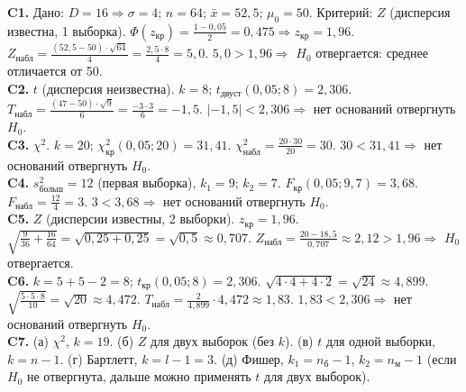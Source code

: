 \documentclass[a4paper,11pt]{extarticle}
\newcommand{\kr}{\text{кр}}\newcommand{\nab}{\text{набл}}
\begin{document}
\medskip
\textbf{C1.} Дано: $D=16\Rightarrow\sigma=4$; $n=64$; $\bar x=52{,}5$; $\mu_0=50$. Критерий: $Z$ (дисперсия известна, 1 выборка). $\Phi(z_\kr)=\frac{1-0{,}05}{2}=0{,}475\Rightarrow z_\kr=1{,}96$. $Z_\nab=\frac{(52{,}5-50)\cdot\sqrt{64}}{4}=\frac{2{,}5\cdot8}{4}=5{,}0$. $5{,}0>1{,}96\Rightarrow$ $H_0$ отвергается: среднее отличается от 50.\\
\textbf{C2.} $t$ (дисперсия неизвестна). $k=8$; $t_{\text{двуст}}(0{,}05;8)=2{,}306$. $T_\nab=\frac{(47-50)\cdot\sqrt9}{6}=\frac{-3\cdot3}{6}=-1{,}5$. $|{-1{,}5}|<2{,}306\Rightarrow$ нет оснований отвергнуть $H_0$.\\
\textbf{C3.} $\chi^2$. $k=20$; $\chi^2_\kr(0{,}05;20)=31{,}41$. $\chi^2_\nab=\frac{20\cdot30}{20}=30$. $30<31{,}41\Rightarrow$ нет оснований отвергнуть $H_0$.\\
\textbf{C4.} $s^2_{\text{больш}}=12$ (первая выборка), $k_1=9$; $k_2=7$. $F_\kr(0{,}05;9,7)=3{,}68$. $F_\nab=\frac{12}{4}=3$. $3<3{,}68\Rightarrow$ нет оснований отвергнуть $H_0$.\\
\textbf{C5.} $Z$ (дисперсии известны, 2 выборки). $z_\kr=1{,}96$. $\sqrt{\frac9{36}+\frac{16}{64}}=\sqrt{0{,}25+0{,}25}=\sqrt{0{,}5}\approx0{,}707$. $Z_\nab=\frac{20-18{,}5}{0{,}707}\approx2{,}12>1{,}96\Rightarrow$ $H_0$ отвергается.\\
\textbf{C6.} $k=5+5-2=8$; $t_\kr(0{,}05;8)=2{,}306$. $\sqrt{4\cdot4+4\cdot2}=\sqrt{24}\approx4{,}899$. $\sqrt{\frac{5\cdot5\cdot8}{10}}=\sqrt{20}\approx4{,}472$. $T_\nab=\frac{2}{4{,}899}\cdot4{,}472\approx1{,}83$. $1{,}83<2{,}306\Rightarrow$ нет оснований отвергнуть $H_0$.\\
\textbf{C7.} (а) $\chi^2$, $k=19$. (б) $Z$ для двух выборок (без $k$). (в) $t$ для одной выборки, $k=n-1$. (г) Бартлетт, $k=l-1=3$. (д) Фишер, $k_1=n_{\text{б}}-1$, $k_2=n_{\text{м}}-1$ (если $H_0$ не отвергнута, дальше можно применять $t$ для двух выборок).
\end{document}
